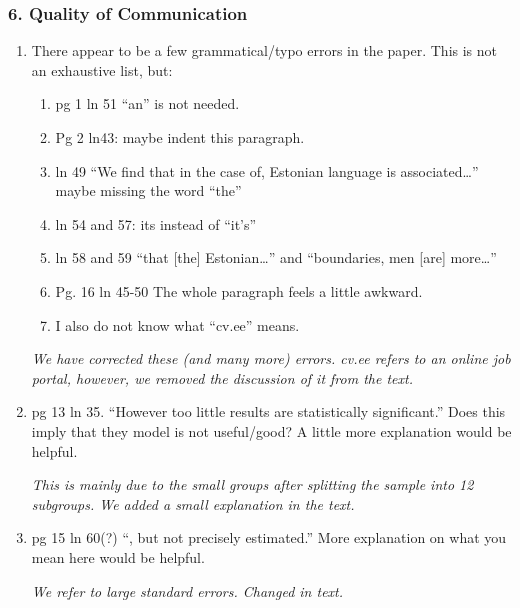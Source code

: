 \documentclass{article}
\newenvironment{response}
{\slshape}{}
\begin{document}
\subsubsection*{6. Quality of Communication}

\begin{enumerate}
\item There appear to be a few grammatical/typo errors in
  the paper. This is not an exhaustive list, but: 
  \begin{enumerate}
  \item pg 1 ln 51 “an” is
    not needed. 
  \item Pg 2 ln43: maybe indent this paragraph. 
  \item ln 49 “We find
    that in the case of, Estonian language is associated…” maybe missing
    the word “the”  
  \item ln 54 and 57: its instead of “it’s” 
  \item ln 58 and 59
    “that [the] Estonian…” and “boundaries, men [are] more…” 
  \item Pg. 16 ln
    45-50 The whole paragraph feels a little awkward. 
  \item I also do not know
    what “cv.ee” means.
  \end{enumerate}

  \begin{response}
    We have corrected these (and many more) errors.  cv.ee refers to
    an online job portal, however, we removed the discussion of
    it from the text.
  \end{response}

\item pg 13 ln 35. “However too little results are
  statistically significant.” Does this imply that they model is not
  useful/good? A little more explanation would be helpful.

  \begin{response}
    This is mainly due to the small groups after splitting the sample
    into 12 subgroups.  We added a small explanation in the text.
  \end{response}

\item pg 15 ln 60(?) “, but not precisely estimated.” More explanation
  on what you mean here would be helpful.

  \begin{response}
    We refer to large standard errors.  Changed in text.
  \end{response}
\end{enumerate}
\end{document}
